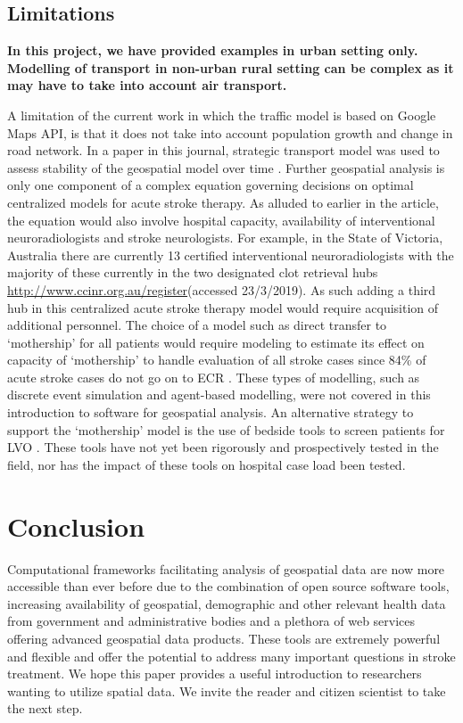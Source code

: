 \documentclass[utf8]{frontiersHLTH}
\begin{document}
\subsection{Limitations}
{\bf
In this project, we have provided examples in urban setting
only. Modelling of transport in non-urban rural setting can be complex
as it may have to take into account air transport.

A limitation of the current work in which the traffic model is based
on Google Maps API, is that it does not take into account population
growth and change in road network. In a paper in this journal,
strategic transport model was used to assess stability of the
geospatial model over time \cite{10.3389/fneur.2019.00692}. Further geospatial
analysis is only one component of a complex equation governing
decisions on optimal centralized models for acute stroke therapy. As
alluded to earlier in the article, the equation would also involve
hospital capacity, availability of interventional neuroradiologists
and stroke neurologists. For example, in the State of Victoria,
Australia there are currently 13 certified interventional
neuroradiologists with the majority of these currently in the two
designated clot retrieval hubs
\url{http://www.ccinr.org.au/register}(accessed 23/3/2019). As such
adding a third hub in this centralized acute stroke therapy model
would require acquisition of additional personnel. The choice of a
model such as direct transfer to ‘mothership’ for all patients would
require modeling to estimate its effect on capacity of ‘mothership’ to
handle evaluation of all stroke cases since 84\% of acute stroke cases
do not go on to ECR \cite{man2018comparison} . These types of
modelling, such as discrete event simulation and agent-based
modelling, were not covered in this introduction to software for
geospatial analysis.  An alternative strategy to support the
‘mothership’ model is the use of bedside tools to screen patients for
LVO \cite{10.3389/fneur.2019.00130}. These tools have not yet been rigorously and
prospectively tested in the field, nor has the impact of these tools
on hospital case load been tested.
}
\section{Conclusion} 
Computational frameworks facilitating analysis of geospatial data are
now more accessible than ever before due to the combination of open
source software tools, increasing availability of geospatial,
demographic and other relevant health data from government and
administrative bodies and a plethora of web services offering advanced
geospatial data products. These tools are extremely powerful and
flexible and offer the potential to address many important questions
in stroke treatment. We hope this paper provides a useful introduction
to researchers wanting to utilize spatial data. We invite the reader
and citizen scientist to take the next step.
\end{document}
